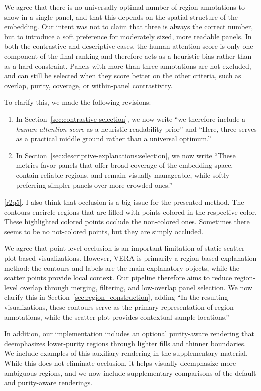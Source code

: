 \documentclass[11pt]{article}
\newcounter{rtaskno}
\newcommand{\rtask}[1]{\refstepcounter{rtaskno}\label{#1}}
\newcommand{\reviewc}[2]{\begin{leftbar}\noindent\rtask{#1}\ref{#1}. #2\end{leftbar}\vspace*{-4mm}}
\newcommand{\answer}[1]{\noindent #1\par\vspace{2mm}}
\newlength{\leftbarwidth}
\newlength{\leftbarsep}
\renewenvironment{leftbar}{%
    \def\FrameCommand{{\color{black}{\vrule width \leftbarwidth\relax\hspace {\leftbarsep}}}}%
    \MakeFramed {\advance \hsize -\width \FrameRestore }%
}{\endMakeFramed}
\begin{document}
\answer{%
We agree that there is no universally optimal number of region annotations to show in a single panel, and that this depends on the spatial structure of the embedding. Our intent was not to claim that three is always the correct number, but to introduce a soft preference for moderately sized, more readable panels. In both the contrastive and descriptive cases, the human attention score is only one component of the final ranking and therefore acts as a heuristic bias rather than as a hard constraint. Panels with more than three annotations are not excluded, and can still be selected when they score better on the other criteria, such as overlap, purity, coverage, or within-panel contrastivity.

To clarify this, we made the following revisions:
\begin{enumerate}
    \item In Section~\ref{sec:contrastive-selection}, we now write ``we therefore include a \textit{human attention score} as a heuristic readability prior'' and ``Here, three serves as a practical middle ground rather than a universal optimum.''
    \item In Section~\ref{sec:descriptive-explanations:selection}, we now write ``These metrics favor panels that offer broad coverage of the embedding space, contain reliable regions, and remain visually manageable, while softly preferring simpler panels over more crowded ones.''
\end{enumerate}
}


\reviewc{r2q5}{I also think that occlusion is a big issue for the presented method. The contours encircle regions that are filled with points colored in the respective color. These highlighted colored points occlude the non-colored ones. Sometimes there seems to be no not-colored points, but they are simply occluded.}

\answer{%
We agree that point-level occlusion is an important limitation of static scatter plot-based visualizations. However, VERA is primarily a region-based explanation method: the contours and labels are the main explanatory objects, while the scatter points provide local context. Our pipeline therefore aims to reduce region-level overlap through merging, filtering, and low-overlap panel selection.
We now clarify this in Section~\ref{sec:region_construction}, adding ``In the resulting visualizations, these contours serve as the primary representation of region annotations, while the scatter plot provides contextual sample locations.''

In addition, our implementation includes an optional purity-aware rendering that deemphasizes lower-purity regions through lighter fills and thinner boundaries. We include examples of this auxiliary rendering in the supplementary material. While this does not eliminate occlusion, it helps visually deemphasize more ambiguous regions, and we now include supplementary comparisons of the default and purity-aware renderings.

}
\end{document}
